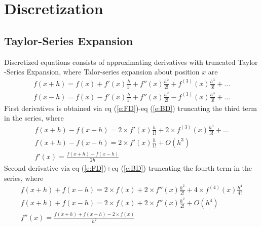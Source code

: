 \documentclass[11pt,dvips]{article}
\numberwithin{equation}{section}
\begin{document}
\section{Discretization}
\subsection{Taylor-Series Expansion}
Discretized equations consists of approximating derivatives with truncated Taylor
-Series Expansion\cite{patankar_numerical_1980}, where Talor-series expansion 
about position $x$ are
%
\begin{gather}
f(x+h)=f(x)+f'(x)\frac{h}{1!}+f''(x)\frac{h^2}{2!}+f^{(3)}(x)\frac{h^3}{3!}+ \ldots  \label{e:FD} \\
f(x-h)=f(x)-f'(x)\frac{h}{1!}+f''(x)\frac{h^2}{2!}-f^{(3)}(x)\frac{h^3}{3!}+ \ldots  \label{e:BD} 
\end{gather}
%
First derivatives is obtained via eq (\ref{e:FD})-eq (\ref{e:BD}) truncating the 
third term in the series, where
%
\begin{gather}
f(x+h)-f(x-h)=2\times f'(x)\frac{h}{1!}+2 \times f^{(3)}(x)\frac{h^3}{3!}+ \ldots \nonumber \\
f(x+h)-f(x-h)=2\times f'(x)\frac{h}{1!}+O(h^3) \nonumber \\
f'(x)=\frac{f(x+h)-f(x-h)}{2h}  \label{e:f_1d}
\end{gather}
%
Second derivative via eq (\ref{e:FD})+eq (\ref{e:BD}) truncating the fourth term 
in the series, where
%
\begin{gather}
f(x+h)+f(x-h)=2\times f(x)+2 \times f''(x)\frac{h^2}{2!}+4 \times f^{(4)}(x)
\frac{h^4}{4!} \nonumber \\
f(x+h)+f(x-h)=2\times f(x)+2 \times f''(x)\frac{h^2}{2!}+O(h^4) \nonumber \\
f''(x)=\frac{f(x+h)+f(x-h)-2\times f(x)}{h^2} \label{e:f_2d}
\end{gather}
%
\end{document}
